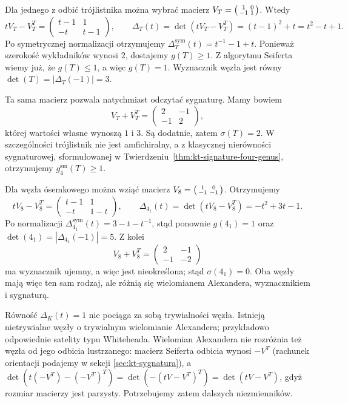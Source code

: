 \begin{przyklad}
Dla jednego z odbić trójlistnika można wybrać macierz
$V_T=\begin{psmallmatrix}1&0\\-1&1\end{psmallmatrix}$. Wtedy
\[
tV_T-V_T^T=
\begin{pmatrix}t-1&1\\-t&t-1\end{pmatrix},
\qquad
\Delta_T(t)=\det(tV_T-V_T^T)=(t-1)^2+t=t^2-t+1.
\]
Po symetrycznej normalizacji otrzymujemy
$\Delta_T^{\mathrm{sym}}(t)=t^{-1}-1+t$.
Ponieważ szerokość wykładników wynosi $2$, dostajemy
$g(T)\ge 1$. Z algorytmu Seiferta wiemy już, że $g(T)\le 1$,
a więc $g(T)=1$. Wyznacznik węzła jest równy
$\det(T)=|\Delta_T(-1)|=3$.

Ta sama macierz pozwala natychmiast odczytać sygnaturę.
Mamy bowiem
\[
V_T+V_T^T=
\begin{pmatrix}2&-1\\-1&2\end{pmatrix},
\]
której wartości własne wynoszą $1$ i $3$. Są dodatnie,
zatem $\sigma(T)=2$. W szczególności trójlistnik nie jest
amfichiralny, a z klasycznej nierówności sygnaturowej,
sformułowanej w Twierdzeniu~\ref{thm:kt-signature-four-genus},
otrzymujemy $g_4^{\mathrm{sm}}(T)\ge 1$.

Dla węzła ósemkowego można wziąć macierz
$V_8=\begin{psmallmatrix}1&0\\-1&-1\end{psmallmatrix}$. Otrzymujemy
\[
tV_8-V_8^T=
\begin{pmatrix}t-1&1\\-t&1-t\end{pmatrix},
\qquad
\Delta_{4_1}(t)=\det(tV_8-V_8^T)=-t^2+3t-1.
\]
Po normalizacji
$\Delta_{4_1}^{\mathrm{sym}}(t)=3-t-t^{-1}$,
stąd ponownie $g(4_1)=1$ oraz
$\det(4_1)=|\Delta_{4_1}(-1)|=5$.
Z kolei
\[
V_8+V_8^T=
\begin{pmatrix}2&-1\\-1&-2\end{pmatrix}
\]
ma wyznacznik ujemny, a więc jest nieokreślona; stąd
$\sigma(4_1)=0$. Oba węzły mają więc ten sam rodzaj,
ale różnią się wielomianem Alexandera, wyznacznikiem i sygnaturą.
\end{przyklad}

\begin{uwaga}
Równość $\Delta_K(t)=1$ nie pociąga za sobą trywialności węzła.
Istnieją nietrywialne węzły o trywialnym wielomianie Alexandera;
przykładowo odpowiednie satelity typu Whiteheada. Wielomian
Alexandera nie rozróżnia też węzła od jego odbicia lustrzanego:
macierz Seiferta odbicia wynosi $-V^T$ (rachunek orientacji
podajemy w sekcji \ref{sec:kt-sygnatura}), a
$\det(t(-V^T)-(-V^T)^T)=\det(-(tV-V^T)^T)
=\det(tV-V^T)$,
gdyż rozmiar macierzy jest parzysty.
Potrzebujemy zatem dalszych niezmienników.
\end{uwaga}

